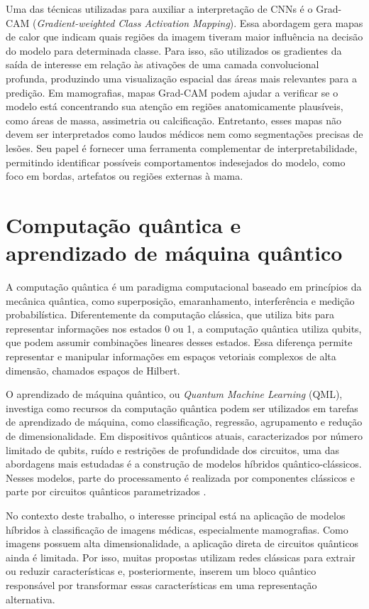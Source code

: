 \documentclass[
    12pt,
    openright,
    oneside,
    a4paper,
    english,
    brazil
]{abntex2}
\begin{document}
Uma das técnicas utilizadas para auxiliar a interpretação de CNNs é o Grad-CAM (\textit{Gradient-weighted Class Activation Mapping}). Essa abordagem gera mapas de calor que indicam quais regiões da imagem tiveram maior influência na decisão do modelo para determinada classe. Para isso, são utilizados os gradientes da saída de interesse em relação às ativações de uma camada convolucional profunda, produzindo uma visualização espacial das áreas mais relevantes para a predição.
Em mamografias, mapas Grad-CAM podem ajudar a verificar se o modelo está concentrando sua atenção em regiões anatomicamente plausíveis, como áreas de massa, assimetria ou calcificação. Entretanto, esses mapas não devem ser interpretados como laudos médicos nem como segmentações precisas de lesões. Seu papel é fornecer uma ferramenta complementar de interpretabilidade, permitindo identificar possíveis comportamentos indesejados do modelo, como foco em bordas, artefatos ou regiões externas à mama.

\section{Computação quântica e aprendizado de máquina quântico}

A computação quântica é um paradigma computacional baseado em princípios da mecânica quântica, como superposição, emaranhamento, interferência e medição probabilística. Diferentemente da computação clássica, que utiliza bits para representar informações nos estados 0 ou 1, a computação quântica utiliza qubits, que podem assumir combinações lineares desses estados. Essa diferença permite representar e manipular informações em espaços vetoriais complexos de alta dimensão, chamados espaços de Hilbert.

O aprendizado de máquina quântico, ou \textit{Quantum Machine Learning} (QML), investiga como recursos da computação quântica podem ser utilizados em tarefas de aprendizado de máquina, como classificação, regressão, agrupamento e redução de dimensionalidade. Em dispositivos quânticos atuais, caracterizados por número limitado de qubits, ruído e restrições de profundidade dos circuitos, uma das abordagens mais estudadas é a construção de modelos híbridos quântico-clássicos. Nesses modelos, parte do processamento é realizada por componentes clássicos e parte por circuitos quânticos parametrizados \cite{biamonte2017qml,preskill2018nisq,cerezo2021variational}.

No contexto deste trabalho, o interesse principal está na aplicação de modelos híbridos à classificação de imagens médicas, especialmente mamografias. Como imagens possuem alta dimensionalidade, a aplicação direta de circuitos quânticos ainda é limitada. Por isso, muitas propostas utilizam redes clássicas para extrair ou reduzir características e, posteriormente, inserem um bloco quântico responsável por transformar essas características em uma representação alternativa.
\end{document}
